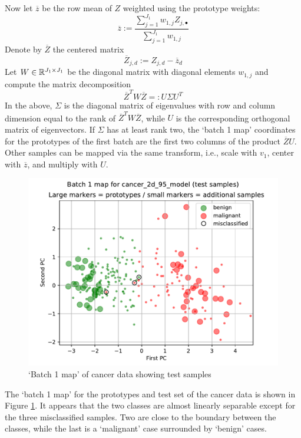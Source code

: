 Now let $\overline{z}$ be the row mean of $Z$ weighted using the prototype weights:
%
\begin{equation}
\overline{z}:=\frac{\sum_{j=1}^{J_1}w_{1,j}Z_{j,\bullet}}
{\sum_{j=1}^{J_1}w_{1,j}}\label{eq_weighted_mean}
\end{equation}
%
Denote by $\overline{Z}$ the centered matrix
%
\begin{equation}
\overline{Z}_{j,d}:=Z_{j,d}-\overline{z}_d\label{eq_centered_Z}
\end{equation}
%
Let $W\in\mathbb{R}^{J_1\times J_1}$ be the diagonal matrix with diagonal elements $w_{1,j}$ and compute the matrix decomposition
%
\begin{equation}
\overline{Z}^TW\overline{Z}=:U\Sigma U^T\label{eq_weighted_svd}
\end{equation}
%
In the above, $\Sigma$ is the diagonal matrix of eigenvalues with row and column dimension equal to the rank of $\overline{Z}^TW\overline{Z}$, while $U$ is the corresponding orthogonal matrix of eigenvectors.
If $\Sigma$ has at least rank two, the `batch 1 map' coordinates for the prototypes of the first batch are the first two columns of the product $\overline{Z}U$.
Other samples can be mapped via the same transform, i.e., scale with $v_1$, center with $\overline{z}$, and multiply with $U$.\par
%
\begin{figure}
\caption{`Batch 1 map' of cancer data showing test samples}
\label{fig_batch_1_map_test}
%
\begin{center}
\includegraphics[height=0.4\textheight]{figures/cancer_batch_1_map_testing_data.pdf}
\end{center}
\end{figure}
%
The `batch 1 map' for the prototypes and test set of the cancer data is shown in Figure \ref{fig_batch_1_map_test}.
It appears that the two classes are almost linearly separable except for the three misclassified samples.
Two are close to the boundary between the classes, while the last is a `malignant' case surrounded by `benign' cases.
%
